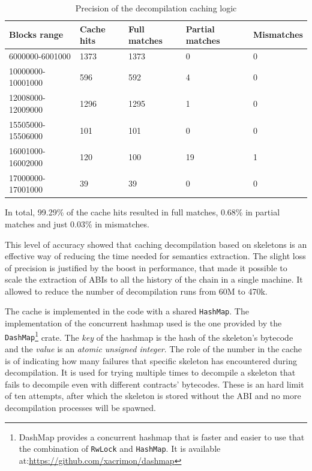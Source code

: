 \begin{table}[ht!]
\centering
    \begin{threeparttable}
    \begin{tabular}{m{3cm} m{2cm} m{2cm} m{2cm} m{2.5cm}} 
    \toprule
    \textbf{Blocks range} & \textbf{Cache hits} & \textbf{Full matches} & \textbf{Partial matches} & \textbf{Mismatches}   \\
    \midrule
    6000000-6001000   & 1373 & 1373 & 0 & 0 \\
    10000000-10001000 & 596 & 592 & 4 & 0 \\
    12008000-12009000 & 1296 & 1295 & 1 & 0 \\
    15505000-15506000 & 101 & 101 & 0 & 0 \\
    16001000-16002000 & 120 & 100 & 19 & 1 \\
    17000000-17001000 & 39 & 39 & 0 & 0 \\
    \bottomrule
    \end{tabular}
    \end{threeparttable}
    \caption{Precision of the decompilation caching logic}
    \label{table:caching-precision}
\end{table}

In total, 99.29\% of the cache hits resulted in full matches, 0.68\% in partial matches and just 0.03\% in mismatches.

This level of accuracy showed that caching decompilation based on skeletons is an effective way of reducing the time needed for semantics extraction. The slight loss of precision is justified by the boost in performance, that made it possible to scale the extraction of ABIs to all the history of the chain in a single machine. It allowed to reduce the number of decompilation runs from 60M to 470k.

The cache is implemented in the code with a shared \texttt{HashMap}. The implementation of the concurrent hashmap used is the one provided by the {\tt DashMap}\footnote{DashMap provides a concurrent hashmap that is faster and easier to use that the combination of {\tt RwLock} and {\tt HashMap}. It is available at:\url{https://github.com/xacrimon/dashmap}} crate. The \textit{key} of the hashmap is the hash of the skeleton's bytecode and the \textit{value} is an \textit{atomic unsigned integer}. The role of the number in the cache is of indicating how many failures that specific skeleton has encountered during decompilation. It is used for trying multiple times to decompile a skeleton that fails to decompile even with different contracts' bytecodes. These is an hard limit of ten attempts, after which the skeleton is stored without the ABI and no more decompilation processes will be spawned.

